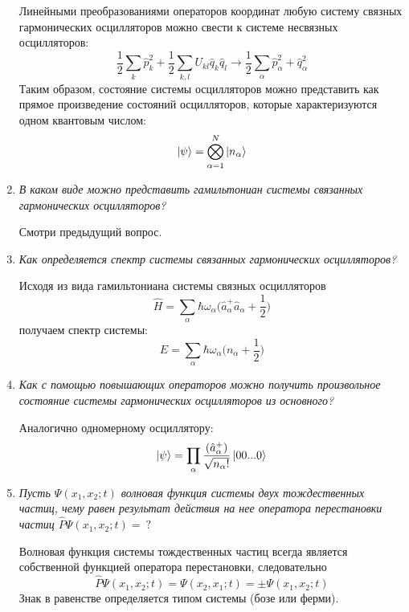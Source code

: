 \documentclass{article}
\begin{document}
\begin{enumerate}
	Линейными преобразованиями операторов координат любую систему связных гармонических осцилляторов можно свести к системе несвязных осцилляторов:
	\begin{equation}
	\frac{1}{2} \sum\limits_{k} \hat{p}^2_k + \frac{1}{2} \sum\limits_{k,l} U_{kl}\hat{q}_k\hat{q}_l \to \frac{1}{2} \sum\limits_{\alpha} \hat{p}^2_\alpha + \hat{q}^2_\alpha
	\end{equation}
	Таким образом, состояние системы осцилляторов можно представить как прямое произведение состояний осцилляторов, которые характеризуются одном квантовым числом:
	\begin{equation}
		\ket{\psi} = \bigotimes\limits_{\alpha = 1}^N \ket{n_\alpha}
	\end{equation}
	
	\item \textit{В каком виде можно представить гамильтониан системы связанных гармонических осцилляторов?}
	
	Смотри предыдущий вопрос.
	
	\item \textit{Как определяется спектр системы связанных гармонических осцилляторов?}
	
	Исходя из вида гамильтониана системы связных осцилляторов
	\begin{equation}
		\hat{H} = \sum\limits_{\alpha} \hbar \omega_\alpha \Big( \hat{a}^+_\alpha \hat{a}_\alpha + \frac{1}{2} \Big)
	\end{equation}
	получаем спектр системы:
	\begin{equation}
		E = \sum\limits_{\alpha} \hbar \omega_\alpha \Big( n_\alpha + \frac{1}{2} \Big)
	\end{equation}
	
	\item \textit{Как с помощью повышающих операторов можно получить произвольное состояние системы гармонических осцилляторов из основного?}

	Аналогично одномерному осциллятору:
	\begin{equation}
		\ket{\psi} = \prod\limits_{\alpha} \frac{(\hat{a}^+_\alpha)}{\sqrt{n_\alpha!}} \ket{00...0}
	\end{equation}		
	
	\item \textit{Пусть $\Psi(x_1, x_2;t)$ волновая функция системы двух тождественных частиц, чему равен результат действия на нее оператора перестановки частиц $\hat{P}\Psi(x_1, x_2;t) = \ ?$}
	
	Волновая функция системы тождественных частиц всегда является собственной функцией оператора перестановки, следовательно
	\begin{equation}
		\hat{P}\Psi(x_1, x_2;t) = \Psi(x_2, x_1;t) = \pm \Psi(x_1, x_2;t)
	\end{equation}
	Знак в равенстве определяется типом системы (бозе или ферми).
	

\end{enumerate}
\end{document}
